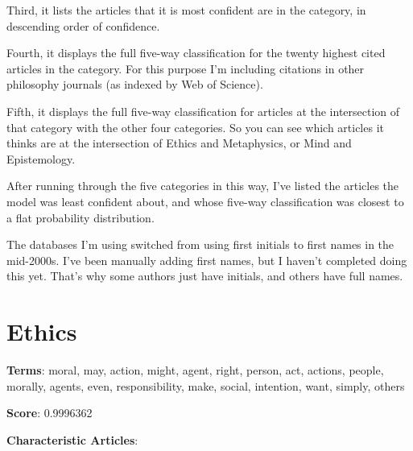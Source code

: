 \documentclass[
  10pt,
  letterpaper,
  DIV=11,
  numbers=noendperiod,
  twoside]{scrartcl}
\begin{document}
Third, it lists the articles that it is most confident are in the
category, in descending order of confidence.

Fourth, it displays the full five-way classification for the twenty
highest cited articles in the category. For this purpose I'm including
citations in other philosophy journals (as indexed by Web of Science).

Fifth, it displays the full five-way classification for articles at the
intersection of that category with the other four categories. So you can
see which articles it thinks are at the intersection of Ethics and
Metaphysics, or Mind and Epistemology.

After running through the five categories in this way, I've listed the
articles the model was least confident about, and whose five-way
classification was closest to a flat probability distribution.

The databases I'm using switched from using first initials to first
names in the mid-2000s. I've been manually adding first names, but I
haven't completed doing this yet. That's why some authors just have
initials, and others have full names.

\section{Ethics}\label{ethics}

\textbf{Terms}: moral, may, action, might, agent, right, person, act,
actions, people, morally, agents, even, responsibility, make, social,
intention, want, simply, others

\textbf{Score}: 0.9996362

\textbf{Characteristic Articles}:
\end{document}
